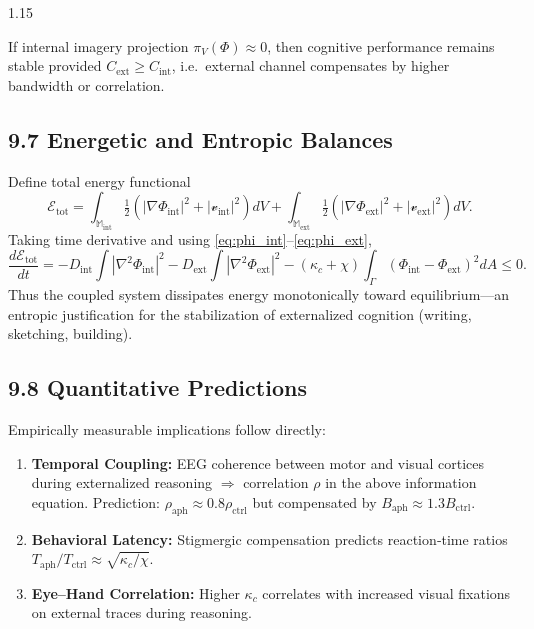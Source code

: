 \documentclass[12pt,a4paper]{article}
\begin{document}
\begin{spacing}{1.15}
\begin{proposition}
If internal imagery projection $\pi_V(\Phi)\!\approx\!0$,  
then cognitive performance remains stable provided
$C_{\mathrm{ext}}\ge C_{\mathrm{int}}$,
i.e.\ external channel compensates by higher bandwidth or correlation.
\end{proposition}

\subsection{9.7 Energetic and Entropic Balances}

Define total energy functional
\[
\mathcal{E}_{\mathrm{tot}}
 = \int_{\mathbb{M}_{\mathrm{int}}}
   \tfrac{1}{2}\!\left(|\nabla\Phi_{\mathrm{int}}|^2
     +|\boldsymbol{\mathcal v}_{\mathrm{int}}|^2\right)\!dV
  +\int_{\mathbb{M}_{\mathrm{ext}}}
   \tfrac{1}{2}\!\left(|\nabla\Phi_{\mathrm{ext}}|^2
     +|\boldsymbol{\mathcal v}_{\mathrm{ext}}|^2\right)\!dV.
\]
Taking time derivative and using \eqref{eq:phi_int}–\eqref{eq:phi_ext},
\[
\frac{d\mathcal{E}_{\mathrm{tot}}}{dt}
 = -D_{\mathrm{int}}\!\int|\nabla^2\Phi_{\mathrm{int}}|^2
   -D_{\mathrm{ext}}\!\int|\nabla^2\Phi_{\mathrm{ext}}|^2
   -(\kappa_c+\chi)\!\int_{\Gamma}\!(\Phi_{\mathrm{int}}-\Phi_{\mathrm{ext}})^2dA
   \le 0.
\]
Thus the coupled system dissipates energy monotonically toward equilibrium—an entropic justification for the stabilization of externalized cognition (writing, sketching, building).

\subsection{9.8 Quantitative Predictions}

Empirically measurable implications follow directly:

\begin{enumerate}[label=(\roman*),leftmargin=1.2em]
\item \textbf{Temporal Coupling:}  
EEG coherence between motor and visual cortices during externalized reasoning  
$\Rightarrow$ correlation $\rho$ in the above information equation.  
Prediction: $\rho_{\mathrm{aph}}\!\approx\!0.8\rho_{\mathrm{ctrl}}$ but compensated by $B_{\mathrm{aph}}\!\approx\!1.3B_{\mathrm{ctrl}}$.
\item \textbf{Behavioral Latency:}  
Stigmergic compensation predicts reaction‐time ratios  
$T_{\mathrm{aph}}/T_{\mathrm{ctrl}}\!\approx\!\sqrt{\kappa_c/\chi}$.
\item \textbf{Eye–Hand Correlation:}  
Higher $\kappa_c$ correlates with increased visual fixations on external traces during reasoning.
\end{enumerate}


\end{spacing}
\end{document}
